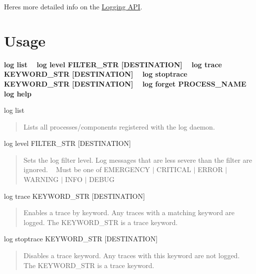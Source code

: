 Here\textquotesingle{}s more detailed info on the \hyperlink{c_logging}{Logging A\+P\+I}.

\section*{Usage}

{\bfseries {\ttfamily  log list ~\newline
 log level F\+I\+L\+T\+E\+R\+\_\+\+S\+T\+R \mbox{[}D\+E\+S\+T\+I\+N\+A\+T\+I\+O\+N\mbox{]} ~\newline
 log trace K\+E\+Y\+W\+O\+R\+D\+\_\+\+S\+T\+R \mbox{[}D\+E\+S\+T\+I\+N\+A\+T\+I\+O\+N\mbox{]} ~\newline
 log stoptrace K\+E\+Y\+W\+O\+R\+D\+\_\+\+S\+T\+R \mbox{[}D\+E\+S\+T\+I\+N\+A\+T\+I\+O\+N\mbox{]} ~\newline
 log forget P\+R\+O\+C\+E\+S\+S\+\_\+\+N\+A\+M\+E ~\newline
 log help }}

\begin{DoxyVerb}log list \end{DoxyVerb}
 \begin{quote}
Lists all processes/components registered with the log daemon. \end{quote}


\begin{DoxyVerb}log level FILTER_STR [DESTINATION] \end{DoxyVerb}
 \begin{quote}
Sets the log filter level. Log messages that are less severe than the filter are ignored. ~\newline
 Must be one of E\+M\+E\+R\+G\+E\+N\+C\+Y $\vert$ C\+R\+I\+T\+I\+C\+A\+L $\vert$ E\+R\+R\+O\+R $\vert$ W\+A\+R\+N\+I\+N\+G $\vert$ I\+N\+F\+O $\vert$ D\+E\+B\+U\+G \end{quote}


\begin{DoxyVerb}log trace KEYWORD_STR [DESTINATION] \end{DoxyVerb}
 \begin{quote}
Enables a trace by keyword. Any traces with a matching keyword are logged. The K\+E\+Y\+W\+O\+R\+D\+\_\+\+S\+T\+R is a trace keyword. \end{quote}


\begin{DoxyVerb}log stoptrace KEYWORD_STR [DESTINATION] \end{DoxyVerb}
 \begin{quote}
Disables a trace keyword. Any traces with this keyword are not logged. The K\+E\+Y\+W\+O\+R\+D\+\_\+\+S\+T\+R is a trace keyword. \end{quote}



